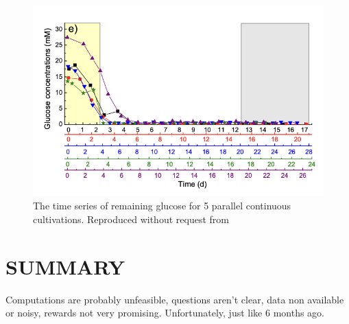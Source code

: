 \documentclass[
10pt, %
a4paper, %
oneside, %
headinclude,footinclude, %
BCOR5mm, %
]{scrartcl}
\begin{document}
\begin{figure}[h]
\centering
\includegraphics[width=0.8\columnwidth]{images/rath_time_serie.png}
\caption[]{
The time series of remaining glucose for 5 parallel continuous cultivations.
Reproduced without request from \cite{rathCharacterisationCellGrowth2017}
}
\label{fig:rath_time_serie}
\end{figure}

\section{SUMMARY}

Computations are probably unfeasible, questions aren't clear, data non available or noisy, rewards not very promising.
Unfortunately, just like 6 months ago.












\end{document}
